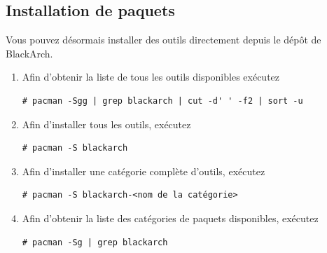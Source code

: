 \documentclass[a4paper, oneside, 11pt]{book}
\begin{document}
\subsection{Installation de paquets}
Vous pouvez désormais installer des outils directement depuis le dépôt de BlackArch.
\begin{enumerate}
\item Afin d'obtenir la liste de tous les outils disponibles exécutez
{\small
\color{gray}
\begin{verbatim}
# pacman -Sgg | grep blackarch | cut -d' ' -f2 | sort -u
\end{verbatim}
}
\item Afin d'installer tous les outils, exécutez
{\small
\color{gray}
\begin{verbatim}
# pacman -S blackarch
\end{verbatim}
}
\item Afin d'installer une catégorie complète d'outils, exécutez
{\small
\color{gray}
\begin{verbatim}
# pacman -S blackarch-<nom de la catégorie>
\end{verbatim}
}
\item Afin d'obtenir la liste des catégories de paquets disponibles, exécutez
{\small
\color{gray}
\begin{verbatim}
# pacman -Sg | grep blackarch
\end{verbatim}
}
\end{enumerate}
\end{document}
